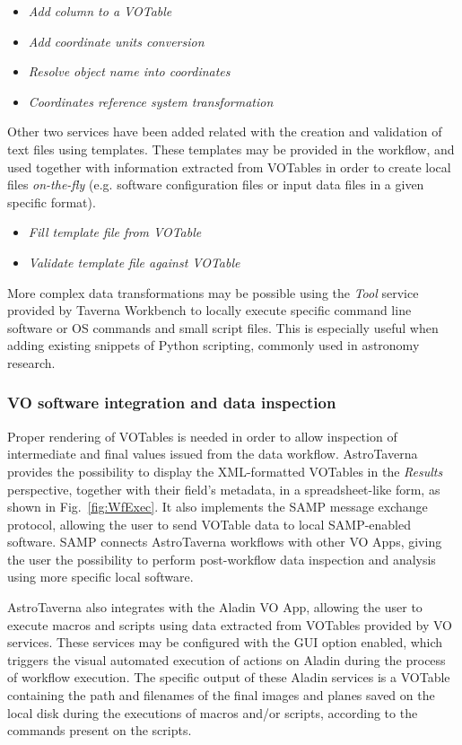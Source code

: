 \documentclass[final,authoryear,5p,times,twocolumn]{elsarticle}
\begin{document}
\begin{itemize}
\item \textit{Add column to a VOTable}
\item \textit{Add coordinate units conversion}
\item \textit{Resolve object name into coordinates} 
\item \textit{Coordinates reference system transformation}
\end{itemize}

Other two services have been added related with the creation and validation of text files using templates. These templates may be provided in the workflow, and used together with information extracted from VOTables in order to create local files \textit{on-the-fly} (e.g. software configuration files or input data files in a given specific format).

\begin{itemize}
\item \textit{Fill template file from VOTable}
\item \textit{Validate template file against VOTable}
\end{itemize}

More complex data transformations may be possible using the \textit{Tool} service provided by Taverna Workbench to locally execute specific command line software or OS commands and small script files. This is especially useful when adding existing snippets of Python scripting, commonly used in astronomy research.  

\subsubsection{VO software integration and data inspection}
\label{VOApps}

Proper rendering of VOTables is needed in order to allow inspection of intermediate and final values issued from the data workflow. AstroTaverna provides the possibility to display the XML-formatted VOTables in the \emph{Results} perspective, together with their field’s metadata, in a spreadsheet-like form, as shown in Fig.~\ref{fig:WfExec}. It also implements the SAMP message exchange protocol, allowing the user to send VOTable data to local SAMP-enabled software. SAMP connects AstroTaverna workflows with other VO Apps, giving the user the possibility to perform post-workflow data inspection and analysis using more specific local software.

AstroTaverna also integrates with the Aladin VO App, allowing the user to execute macros and scripts using data extracted from VOTables provided by VO services. These services may be configured with the GUI option enabled, which triggers the visual automated execution of actions on Aladin during the process of workflow execution. The specific output of these Aladin services is a VOTable containing the path and filenames of the final images and planes saved on the local disk during the executions of macros and/or scripts, according to the commands present on the scripts.
\end{document}
